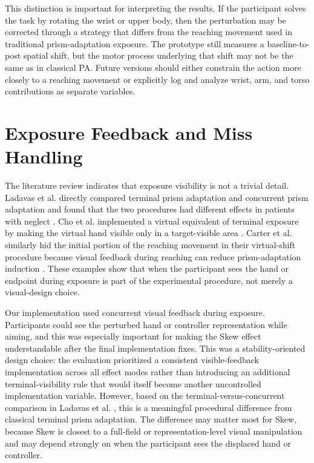 This distinction is important for interpreting the results. If the participant solves the task by rotating the wrist or upper body, then the perturbation may be corrected through a strategy that differs from the reaching movement used in traditional prism-adaptation exposure. The prototype still measures a baseline-to-post spatial shift, but the motor process underlying that shift may not be the same as in classical PA. Future versions should either constrain the action more closely to a reaching movement or explicitly log and analyze wrist, arm, and torso contributions as separate variables.

\section{Exposure Feedback and Miss Handling}
\label{sec:discussion-exposure-feedback}

The literature review indicates that exposure visibility is not a trivial detail. Ladavas et al. directly compared terminal prism adaptation and concurrent prism adaptation and found that the two procedures had different effects in patients with neglect \cite{Serino2011}. Cho et al. implemented a virtual equivalent of terminal exposure by making the virtual hand visible only in a target-visible area \cite{cho2022feasibility}. Carter et al. similarly hid the initial portion of the reaching movement in their virtual-shift procedure because visual feedback during reaching can reduce prism-adaptation induction \cite{Carter2016}. These examples show that when the participant sees the hand or endpoint during exposure is part of the experimental procedure, not merely a visual-design choice.

Our implementation used concurrent visual feedback during exposure. Participants could see the perturbed hand or controller representation while aiming, and this was especially important for making the Skew effect understandable after the final implementation fixes. This was a stability-oriented design choice: the evaluation prioritized a consistent visible-feedback implementation across all effect modes rather than introducing an additional terminal-visibility rule that would itself become another uncontrolled implementation variable. However, based on the terminal-versus-concurrent comparison in Ladavas et al. \cite{Serino2011}, this is a meaningful procedural difference from classical terminal prism adaptation. The difference may matter most for Skew, because Skew is closest to a full-field or representation-level visual manipulation and may depend strongly on when the participant sees the displaced hand or controller.


